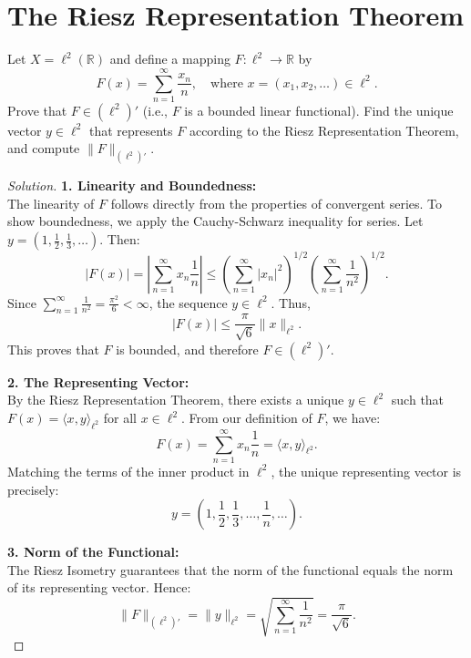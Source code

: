 \documentclass{article}
\begin{document}
\section{The Riesz Representation Theorem}

\begin{problem}
    Let $X = \ell^2(\mathbb{R})$ and define a mapping $F: \ell^2 \to \mathbb{R}$ by
    \[ F(x) = \sum_{n=1}^\infty \frac{x_n}{n}, \quad \text{where } x = (x_1, x_2, \ldots) \in \ell^2. \]
    Prove that $F \in (\ell^2)'$ (i.e., $F$ is a bounded linear functional). Find the unique vector $y \in \ell^2$ that represents $F$ according to the Riesz Representation Theorem, and compute $\|F\|_{(\ell^2)'}$.
\end{problem}

\begin{proof}[Solution]
    \textbf{1. Linearity and Boundedness:} \\
    The linearity of $F$ follows directly from the properties of convergent series. To show boundedness, we apply the Cauchy-Schwarz inequality for series. Let $y = (1, \frac{1}{2}, \frac{1}{3}, \ldots)$. Then:
    \[ |F(x)| = \left| \sum_{n=1}^\infty x_n \frac{1}{n} \right| \leq \left( \sum_{n=1}^\infty |x_n|^2 \right)^{1/2} \left( \sum_{n=1}^\infty \frac{1}{n^2} \right)^{1/2}. \]
    Since $\sum_{n=1}^\infty \frac{1}{n^2} = \frac{\pi^2}{6} < \infty$, the sequence $y \in \ell^2$. Thus,
    \[ |F(x)| \leq \frac{\pi}{\sqrt{6}} \|x\|_{\ell^2}. \]
    This proves that $F$ is bounded, and therefore $F \in (\ell^2)'$.
    
    \textbf{2. The Representing Vector:} \\
    By the Riesz Representation Theorem, there exists a unique $y \in \ell^2$ such that $F(x) = \langle x, y \rangle_{\ell^2}$ for all $x \in \ell^2$. From our definition of $F$, we have:
    \[ F(x) = \sum_{n=1}^\infty x_n \frac{1}{n} = \langle x, y \rangle_{\ell^2}. \]
    Matching the terms of the inner product in $\ell^2$, the unique representing vector is precisely:
    \[ y = \left( 1, \frac{1}{2}, \frac{1}{3}, \ldots, \frac{1}{n}, \ldots \right). \]
    
    \textbf{3. Norm of the Functional:} \\
    The Riesz Isometry guarantees that the norm of the functional equals the norm of its representing vector. Hence:
    \[ \|F\|_{(\ell^2)'} = \|y\|_{\ell^2} = \sqrt{\sum_{n=1}^\infty \frac{1}{n^2}} = \frac{\pi}{\sqrt{6}}. \]
\end{proof}
\end{document}
